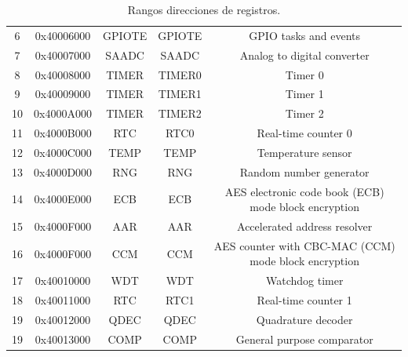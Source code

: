 \begin{table}[H]
\begin{tabular}{|c|c|c|c|c|}
        6 & 0x40006000 & GPIOTE & GPIOTE & GPIO tasks and events \\
        7 & 0x40007000 & SAADC & SAADC & Analog to digital converter \\
        8 & 0x40008000 & TIMER & TIMER0 & Timer 0 \\
        9 & 0x40009000 & TIMER & TIMER1 & Timer 1 \\
        10 & 0x4000A000 & TIMER & TIMER2 & Timer 2 \\
        11 & 0x4000B000 & RTC & RTC0 & Real-time counter 0 \\
        12 & 0x4000C000 & TEMP & TEMP & Temperature sensor \\
        13 & 0x4000D000 & RNG & RNG & Random number generator \\
        14 & 0x4000E000 & ECB & ECB & AES electronic code book (ECB) mode block encryption \\
        15 & 0x4000F000 & AAR & AAR & Accelerated address resolver \\
        16 & 0x4000F000 & CCM & CCM & AES counter with CBC-MAC (CCM) mode block encryption \\
        17 & 0x40010000 & WDT & WDT & Watchdog timer \\
        18 & 0x40011000 & RTC & RTC1 & Real-time counter 1 \\
        19 & 0x40012000 & QDEC & QDEC & Quadrature decoder \\
        19 & 0x40013000 & COMP & COMP & General purpose comparator \\
        \hline
    \end{tabular}
    \caption{Rangos direcciones de registros.\cite{ST}}
    \label{tab:nrf52840_peripherals}
\end{table}

